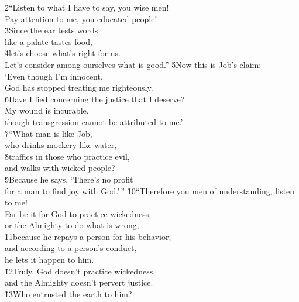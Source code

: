 \begin{poetry}
\poeml \v{2}``Listen to what I have to say, you wise men! \\
\poemll    Pay attention to me, you educated people! \\
\poeml \v{3}Since the ear tests words \\
\poemll    like a palate tastes food, \\
\poeml \v{4}let's choose what's right for us. \\
\poemll    Let's consider among ourselves what is good.''
\poeml \v{5}Now this is Job's claim: \\
\poeml `Even though I'm innocent, \\
\poemll    God has stopped treating me righteously. \\
\poeml \v{6}Have I lied concerning the justice that I deserve? \\
\poemll    My wound is incurable, \\
\poemlll       though transgression cannot be attributed to me.' \\
\poeml \v{7}``What man is like Job, \\
\poemll    who drinks mockery like water, \\
\poeml \v{8}traffics in those who practice evil, \\
\poemll    and walks with wicked people? \\
\poeml \v{9}Because he says, `There's no profit \\
\poemll    for a man to find joy with God.'\,''
\poeml \v{10}``Therefore you men of understanding, listen to me! \\
\poemll    Far be it for God to practice wickedness, \\
\poemlll       or the Almighty to do what is wrong, \\
\poeml \v{11}because he repays a person for his behavior; \\
\poemll    and according to a person's conduct, \\
\poemlll       he lets it happen to him. \\
\poeml \v{12}Truly, God doesn't practice wickedness, \\
\poemll    and the Almighty doesn't pervert justice. \\
\poeml \v{13}Who entrusted the earth to him? \\

\end{poetry}
